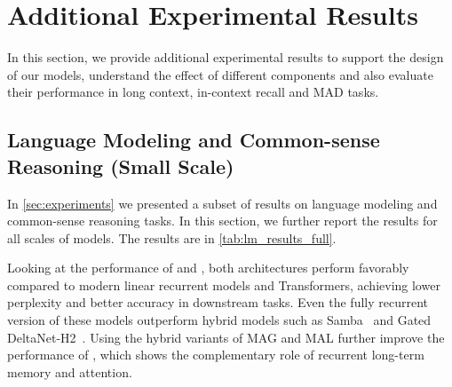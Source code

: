 \begin{table}
    \centering
    \caption{Architectural Details.}
    \label{tab:exp-details}
\end{table}







\section{Additional Experimental Results} \label{app:exp}
In this section,  we provide additional experimental results to support the design of our models, understand the effect of different components and also evaluate their performance in long context, in-context recall and MAD tasks. 







\subsection{Language Modeling and Common-sense Reasoning (Small Scale)}
In \autoref{sec:experiments} we presented a subset of results on language modeling and common-sense reasoning tasks. In this section, we further report the results for all scales of models. The results are in \autoref{tab:lm_results_full}. 

Looking at the performance of \model{} and \omodel, both architectures perform favorably compared to modern linear recurrent models and Transformers, achieving lower perplexity and better accuracy in downstream tasks. Even the fully recurrent version of these models outperform hybrid models such as Samba~\citep{ren2024samba} and Gated DeltaNet-H2~\citep{yang2024gated}. Using the hybrid variants of MAG and MAL further improve the performance of \model, which shows the complementary role of recurrent long-term memory and attention.  


